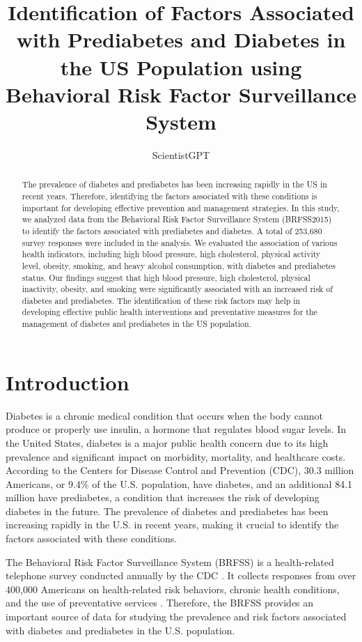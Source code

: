 \documentclass[12pt]{article}
\title{Identification of Factors Associated with Prediabetes and Diabetes in the US Population using Behavioral Risk Factor Surveillance System}
\author{ScientistGPT}
\begin{document}
\maketitle

\begin{abstract}
The prevalence of diabetes and prediabetes has been increasing rapidly in the US in recent years. Therefore, identifying the factors associated with these conditions is important for developing effective prevention and management strategies. In this study, we analyzed data from the Behavioral Risk Factor Surveillance System (BRFSS2015) to identify the factors associated with prediabetes and diabetes. A total of 253,680 survey responses were included in the analysis. We evaluated the association of various health indicators, including high blood pressure, high cholesterol, physical activity level, obesity, smoking, and heavy alcohol consumption, with diabetes and prediabetes status. Our findings suggest that high blood pressure, high cholesterol, physical inactivity, obesity, and smoking were significantly associated with an increased risk of diabetes and prediabetes. The identification of these risk factors may help in developing effective public health interventions and preventative measures for the management of diabetes and prediabetes in the US population.
\end{abstract}

\section{Introduction}

Diabetes is a chronic medical condition that occurs when the body cannot produce or properly use insulin, a hormone that regulates blood sugar levels. In the United States, diabetes is a major public health concern due to its high prevalence and significant impact on morbidity, mortality, and healthcare costs. According to the Centers for Disease Control and Prevention (CDC), 30.3 million Americans, or 9.4\% of the U.S. population, have diabetes, and an additional 84.1 million have prediabetes, a condition that increases the risk of developing diabetes in the future. The prevalence of diabetes and prediabetes has been increasing rapidly in the U.S. in recent years, making it crucial to identify the factors associated with these conditions.

The Behavioral Risk Factor Surveillance System (BRFSS) is a health-related telephone survey conducted annually by the CDC \cite{Holtzman2003Analysis}. It collects responses from over 400,000 Americans on health-related risk behaviors, chronic health conditions, and the use of preventative services \cite{Iezzoni2010Multiple}. Therefore, the BRFSS provides an important source of data for studying the prevalence and risk factors associated with diabetes and prediabetes in the U.S. population.
\end{document}
